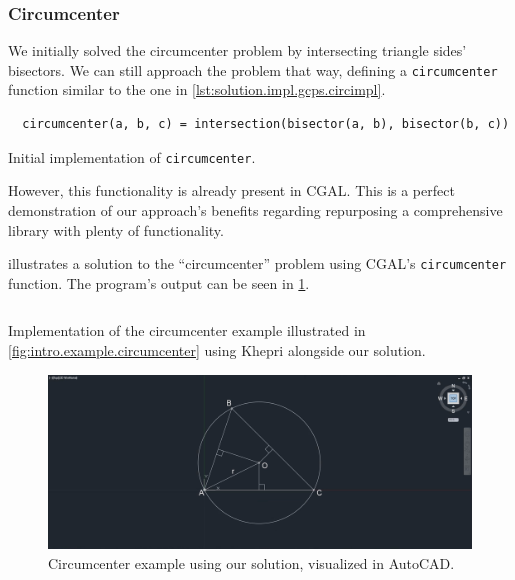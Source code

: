 \subsubsection*{Circumcenter}%
\label{sec:solution.impl.gcps.circumcenter}

We initially solved the circumcenter problem by intersecting triangle sides'
bisectors.  We can still approach the problem that way, defining a
\texttt{circumcenter} function similar to the one in
\cref{lst:solution.impl.gcps.circimpl}.

\begin{listing}[htbp]
  \begin{verbatim}
  circumcenter(a, b, c) = intersection(bisector(a, b), bisector(b, c)) 
  \end{verbatim}
  \caption[Initial circumcenter solution]{
    Initial implementation of \texttt{circumcenter}.}%
  \label{lst:solution.impl.gcps.circimpl}
\end{listing}

However, this functionality is already present in \ac{CGAL}.  This is a perfect
demonstration of our approach's benefits regarding repurposing a comprehensive
library with plenty of functionality.

 illustrates a solution to the
``circumcenter'' problem using \ac{CGAL}'s \texttt{circumcenter} function.  The
program's output can be seen in \cref{fig:solution.impl.gcps.circumcenter}.

\begin{listing}[htbp]
  \inputminted[highlightlines={2,4-5,17}]{julia}{jl/ex_circumcenter.jl}
  \caption[Circumcenter example using our solution]{
    Implementation of the circumcenter example illustrated in
    \cref{fig:intro.example.circumcenter} using Khepri alongside our solution.}%
  \label{lst:solution.impl.gcps.circumcenter}
\end{listing}

\begin{figure}[htbp]
  \includegraphics[width=\linewidth]{fig/autocad-circumcenter} 
  \caption[Circumcenter example using our solution]{
    Circumcenter example using our solution, visualized in AutoCAD\@.}%
  \label{fig:solution.impl.gcps.circumcenter}
\end{figure}

